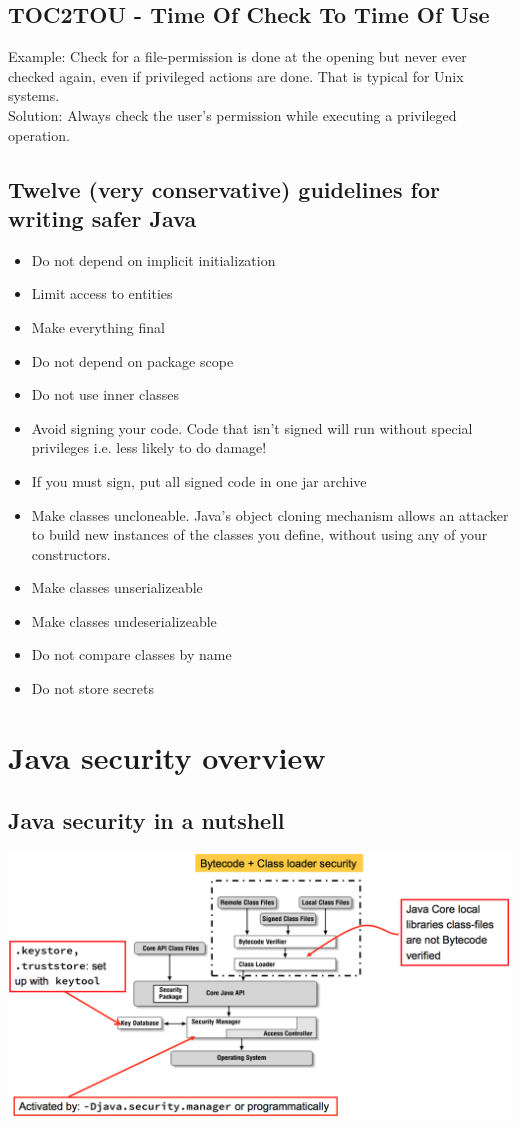 \documentclass[10pt]{article}
\begin{document}
\subsection{TOC2TOU - Time Of Check To Time Of Use}
Example: Check for a file-permission is done at the opening but never ever checked again, even if privileged actions are done. That is typical for Unix systems.\\
Solution: Always check the user's permission while executing a privileged operation.
\subsection{Twelve (very conservative) guidelines for writing safer Java}
\begin{itemize}
	\item Do not depend on implicit initialization
	\item Limit access to entities
	\item Make everything final
	\item Do not depend on package scope
	\item Do not use inner classes
	\item Avoid signing your code. Code that isn't signed will run without special privileges i.e. less likely to do damage!
	\item If you must sign, put all signed code in one jar archive
	\item Make classes uncloneable. Java's object cloning mechanism allows an attacker to build new instances of the classes you define, without using any of your constructors.
	\item Make classes unserializeable
	\item Make classes undeserializeable
	\item Do not compare classes by name
	\item Do not store secrets
\end{itemize}

\newpage
\section{Java security overview}
\subsection{Java security in a nutshell}
\begin{center}
	\includegraphics[scale=0.3]{nutshell.png}
\end{center}
\end{document}
